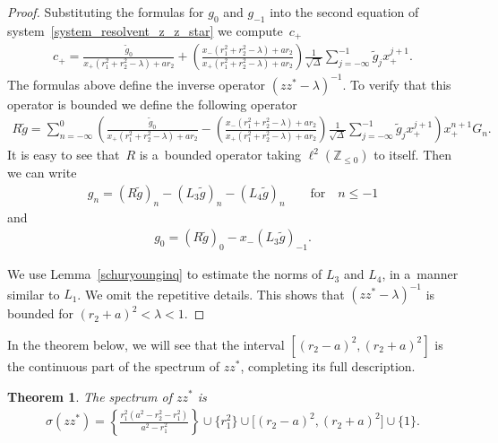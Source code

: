 \documentclass[11pt]{article}
\numberwithin{equation}{section}
\newtheorem{Theorem}{Theorem}[section]
\begin{document}
\begin{proof}
Substituting the formulas for $g_{0}$ and $g_{-1}$ into the second equation of system~\eqref{system_resolvent_z_z_star}
we com\-pu\-te~$c_+$
\begin{gather*}
c_+=\frac{\tilde{g}_0}{x_+(r_1^2+r_2^2-\lambda)+ar_2}+\left(\frac{{x_-(r_1^2+r_2^2-\lambda)+ar_2}}{x_+(r_1^2
+r_2^2-\lambda)+ar_2}\right) \frac{1}{\sqrt{\Delta}}\sum\limits_{j=-\infty}^{-1}\tilde{g}_jx_+^{j+1}.
\end{gather*}
The formulas above def\/ine the inverse operator $(zz^*-\lambda)^{-1}$.
To verify that this operator is bounded we def\/ine the following operator
\begin{gather*}
R\tilde{g}=\!\sum\limits_{n=-\infty}^0\!\!\left(\!\frac{\tilde{g}_0}{x_+(r_1^2+r_2^2-\lambda)+ar_2}-
\left(\frac{{x_-(r_1^2+r_2^2-\lambda)+ar_2}}{x_+(r_1^2+r_2^2-\lambda)+ar_2}\right)\!
\frac{1}{\sqrt{\Delta}}\sum\limits_{j=-\infty}^{-1}\!\!\tilde{g}_jx_+^{j+1}\!\right)\!x_+^{n+1}G_n.
\end{gather*}
It is easy to see that~$R$ is a~bounded operator taking $\ell^2({\mathbb Z}_{\leq 0})$ to itself.
Then we can write
\begin{gather*}
g_n=\left(R\tilde{g}\right)_n-\left(L_3\tilde{g}\right)_n-\left(L_4\tilde{g}\right)_n \qquad\text{for}\quad  n\leq -1
\end{gather*}
and
\begin{gather*}
g_0 =\left(R\tilde{g}\right)_0-x_-\left(L_3\tilde{g}\right)_{-1}.
\end{gather*}

We use Lemma~\ref{schuryounginq} to estimate the norms of $L_3$ and $L_4$, in a~manner similar to $L_1$.
We omit the repetitive details.
This shows that $(zz^*-\lambda)^{-1}$ is bounded for $(r_2+a)^2<\lambda<1$.
\end{proof}

In the theorem below, we will see that the interval $[(r_2-a)^2,(r_2+a)^2]$ is the continuous part of the spectrum of
$zz^*$, completing its full description.

\begin{Theorem}
The spectrum of $zz^*$ is
\begin{gather*}
\sigma(zz^*)= \left\{\frac{r_1^2(a^2-r_2^2-r_1^2)}{a^2-r_1^2}\right\}\cup\big\{r_1^2\big\}\cup \big[(r_2-a)^2,(r_2+a)^2\big]\cup\{1\}.
\end{gather*}
\end{Theorem}
\end{document}
